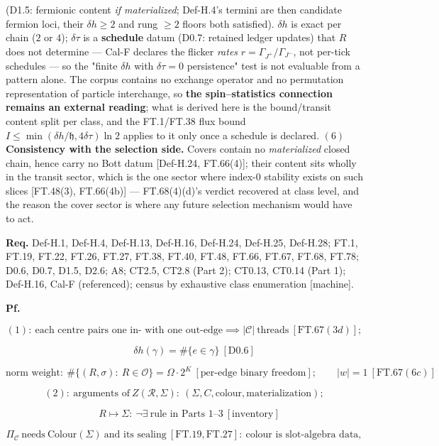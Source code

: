 \begin{theorem}
(D1.5: fermionic content \textit{if materialized}; Def-H.4's termini are then candidate fermion loci, their $\delta h\ge2$ and rung $\ge2$ floors both satisfied). $\delta h$ is exact per chain ($2$ or $4$); $\delta\tau$ is a \textbf{schedule} datum (D0.7: retained ledger updates) that $R$ does not determine — Cal-F declares the flicker \textit{rates} $r=\Gamma_{J^+}/\Gamma_{J^-}$, not per-tick schedules — so the "finite $\delta h$ with $\delta\tau=0$ persistence" test is not evaluable from a pattern alone. The corpus contains no exchange operator and no permutation representation of particle interchange, so \textbf{the spin–statistics connection remains an external reading}; what is derived here is the bound/transit content split per class, and the FT.1/FT.38 flux bound $I\le\min(\delta h/\mathfrak h,4\delta\tau)\ln2$ applies to it only once a schedule is declared. $(6)$ \textbf{Consistency with the selection side.} Covers contain no \textit{materialized} closed chain, hence carry no Bott datum [Def-H.24, FT.66(4)]; their content sits wholly in the transit sector, which is the one sector where index-$0$ stability exists on such slices [FT.48(3), FT.66(4b)] — FT.68(4)(d)'s verdict recovered at class level, and the reason the cover sector is where any future selection mechanism would have to act.

\textbf{Req.} Def-H.1, Def-H.4, Def-H.13, Def-H.16, Def-H.24, Def-H.25, Def-H.28; FT.1, FT.19, FT.22, FT.26, FT.27, FT.38, FT.40, FT.48, FT.66, FT.67, FT.68, FT.78; D0.6, D0.7, D1.5, D2.6; A8; CT2.5, CT2.8 (Part 2); CT0.13, CT0.14 (Part 1); Def-H.16, Cal-F (referenced); census by exhaustive class enumeration [machine].

\textbf{Pf.}

\[
(1):\ \text{each centre pairs one in- with one out-edge}\implies|\mathcal C|\ \text{threads}\ [\mathrm{FT.67}(3d)];
\]

\[
\qquad \delta h(\gamma)=\#\{e\in\gamma\}\ [\mathrm{D0.6}]
\]

\[
\text{norm weight}:\ \#\{(R,\sigma):\ R\in\mathcal O\}=\Omega\cdot2^{K}\ [\text{per-edge binary freedom}];\qquad|w|=1\ [\mathrm{FT.67}(6c)]
\]

\[
(2):\ \text{arguments of}\ Z(\mathcal R,\Sigma):\ (\Sigma,C,\text{colour},\text{materialization});
\]

\[
\quad R\mapsto\Sigma:\ \neg\exists\ \text{rule in Parts 1–3}\ [\text{inventory}]
\]

\[
\Pi_{\mathcal C}\ \text{needs}\ \mathrm{Colour}(\Sigma)\ \text{and its sealing}\ [\mathrm{FT.19},\mathrm{FT.27}]:\ \text{colour is slot-algebra data},
\]


\end{theorem}
